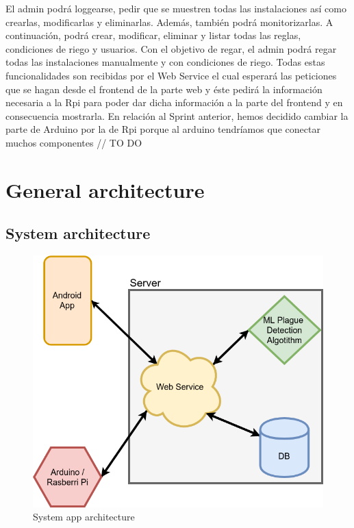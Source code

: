 \documentclass[11pt,a4paper]{article}
\begin{document}
El admin podrá loggearse, pedir que se muestren todas las instalaciones así como crearlas, modificarlas y eliminarlas. Además, también podrá monitorizarlas. A continuación, podrá crear, modificar, eliminar y listar todas las reglas, condiciones de riego y usuarios. Con el objetivo de regar, el admin podrá regar todas las instalaciones manualmente y con condiciones de riego. Todas estas funcionalidades son recibidas por el Web Service el cual esperará las peticiones que se hagan desde el frontend de la parte web y éste pedirá la información necesaria a la Rpi para poder dar dicha información a la parte del frontend y en consecuencia mostrarla.   
\newline\newline
En relación al Sprint anterior, hemos decidido cambiar la parte de Arduino por la de Rpi porque al arduino tendríamos que conectar muchos componentes // TO DO
\newpage

\section{General architecture}
\subsection{System architecture}
\begin{figure}[hbtp]
\centering
\includegraphics[scale=0.6]{AppArchitecture.png}
\caption{System app architecture}
\end{figure}
\end{document}
